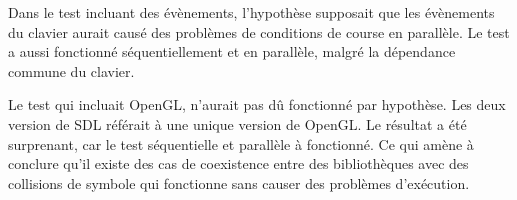 \documentclass[12pt,initial,twoside,maitrise]{dms}
\numberwithin{equation}{section}
\numberwithin{table}{chapter}
\numberwithin{figure}{chapter}
\begin{document}
Dans le test incluant des évènements, l'hypothèse supposait que les évènements du clavier
aurait causé des problèmes de conditions de course en parallèle. Le test a aussi fonctionné
séquentiellement et en parallèle, malgré la dépendance commune du clavier.

Le test qui incluait OpenGL, n'aurait pas dû fonctionné par hypothèse. Les deux version
de SDL référait à une unique version de OpenGL. Le résultat a été surprenant, car le test
séquentielle et parallèle à fonctionné. Ce qui amène à conclure qu'il existe des cas
de coexistence entre des bibliothèques avec des collisions de symbole qui fonctionne
sans causer des problèmes d'exécution.



%
%
%
\end{document}

